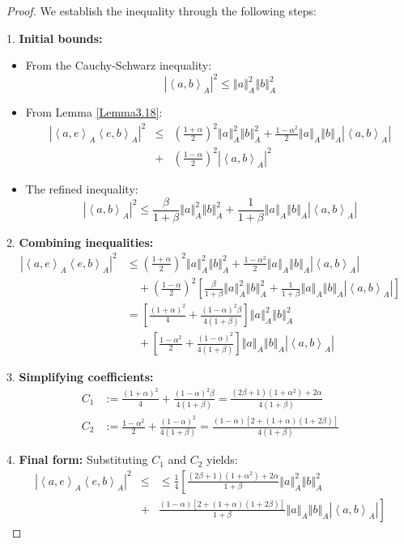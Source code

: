 \documentclass[10pt,a4paper]{amsart}
\newcommand{\abs}[1]{\left\vert#1\right\vert}
\newcommand{\normA}[1]{{\left\Vert#1\right\Vert}_{A}}
\newcommand{\seqA}[1]{{\left<#1\right>}_{A}}
\begin{document}
\begin{proof}
We establish the inequality through the following steps:

1. \textbf{Initial bounds:}
\begin{itemize}
\item From the Cauchy-Schwarz inequality:
\begin{equation}\label{eq:cauchy_schwarz}
\abs{\seqA{a,b}}^2 \leq \normA{a}^2\normA{b}^2
\end{equation}

\item From Lemma \ref{Lemma3.18}:
\begin{eqnarray}\label{eq:lemma318}
  \abs{\seqA{a,e}\seqA{e,b}}^2 &\leq&\left(\frac{1+\alpha}{2}\right)^2\normA{a}^2\normA{b}^2 + \frac{1-\alpha^2}{2}\normA{a}\normA{b}\abs{\seqA{a,b}} \nonumber \\
  &+&\left(\frac{1-\alpha}{2}\right)^2\abs{\seqA{a,b}}^2
\end{eqnarray}
\item The refined inequality:
\begin{equation}\label{eq:refined}
\abs{\seqA{a,b}}^2 \leq \frac{\beta}{1+\beta}\normA{a}^2\normA{b}^2 + \frac{1}{1+\beta}\normA{a}\normA{b}\abs{\seqA{a,b}}
\end{equation}
\end{itemize}

2. \textbf{Combining inequalities:}
\begin{align*}
\abs{\seqA{a,e}\seqA{e,b}}^2
&\leq \left(\frac{1+\alpha}{2}\right)^2\normA{a}^2\normA{b}^2 + \frac{1-\alpha^2}{2}\normA{a}\normA{b}\abs{\seqA{a,b}} \\
&\quad + \left(\frac{1-\alpha}{2}\right)^2\left[\frac{\beta}{1+\beta}\normA{a}^2\normA{b}^2 + \frac{1}{1+\beta}\normA{a}\normA{b}\abs{\seqA{a,b}}\right] \\
&= \left[\frac{(1+\alpha)^2}{4} + \frac{(1-\alpha)^2\beta}{4(1+\beta)}\right]\normA{a}^2\normA{b}^2 \\
&\quad + \left[\frac{1-\alpha^2}{2} + \frac{(1-\alpha)^2}{4(1+\beta)}\right]\normA{a}\normA{b}\abs{\seqA{a,b}}
\end{align*}

3. \textbf{Simplifying coefficients:}
\begin{align*}
C_1 &:= \frac{(1+\alpha)^2}{4} + \frac{(1-\alpha)^2\beta}{4(1+\beta)} = \frac{(2\beta+1)(1+\alpha^2)+2\alpha}{4(1+\beta)} \\
C_2 &:= \frac{1-\alpha^2}{2} + \frac{(1-\alpha)^2}{4(1+\beta)} = \frac{(1-\alpha)[2+(1+\alpha)(1+2\beta)]}{4(1+\beta)}
\end{align*}

4. \textbf{Final form:}
Substituting $C_1$ and $C_2$ yields:
\begin{eqnarray*}
  \abs{\seqA{a,e}\seqA{e,b}}^2 &\leq&\leq \frac{1}{4}\left[\frac{(2\beta+1)(1+\alpha^2)+2\alpha}{1+\beta}\normA{a}^2\normA{b}^2\right. \\
   &+&\left.\frac{(1-\alpha)[2+(1+\alpha)(1+2\beta)]}{1+\beta}\normA{a}\normA{b}\abs{\seqA{a,b}}\right]
\end{eqnarray*}
\end{proof}
\end{document}
